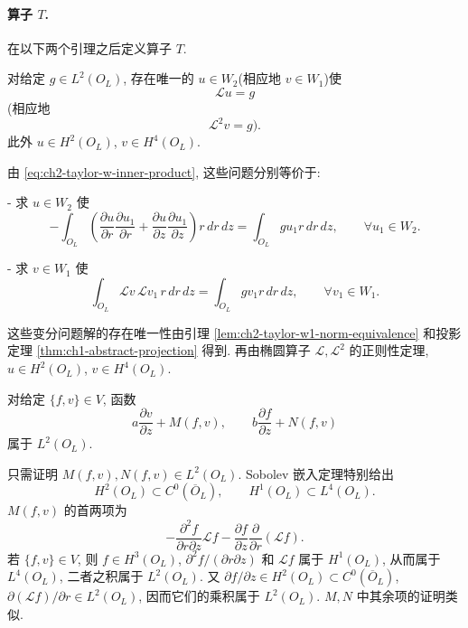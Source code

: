 \paragraph{算子 $T$.}
在以下两个引理之后定义算子 $T$.

\begin{Lemma}
\label{lem:ch2-taylor-elliptic-solvability}
对给定 $g\in L^2(O_L)$, 存在唯一的 $u\in W_2$(相应地 $v\in W_1$)使
\begin{equation}
\mathcal Lu=g
\label{eq:ch2-taylor-second-order-problem}
\end{equation}
(相应地
\begin{equation}
\mathcal L^2v=g).
\label{eq:ch2-taylor-fourth-order-problem}
\end{equation}
此外 $u\in H^2(O_L)$, $v\in H^4(O_L)$.
\end{Lemma}

\begin{Proof}
由 \eqref{eq:ch2-taylor-w-inner-product}, 这些问题分别等价于:

- 求 $u\in W_2$ 使
\[
-\int_{O_L}\left(
\frac{\partial u}{\partial r}\frac{\partial u_1}{\partial r}
+\frac{\partial u}{\partial z}\frac{\partial u_1}{\partial z}
\right)r\,dr\,dz
=\int_{O_L}gu_1r\,dr\,dz,
\qquad\forall u_1\in W_2.
\]

- 求 $v\in W_1$ 使
\[
\int_{O_L}\mathcal Lv\,\mathcal Lv_1\,r\,dr\,dz
=\int_{O_L}gv_1r\,dr\,dz,
\qquad\forall v_1\in W_1.
\]

\hypertarget{chapter-02-page-170}{}
这些变分问题解的存在唯一性由引理 \ref{lem:ch2-taylor-w1-norm-equivalence} 和投影定理 \ref{thm:ch1-abstract-projection} 得到. 再由椭圆算子 $\mathcal L,\mathcal L^2$ 的正则性定理, $u\in H^2(O_L)$, $v\in H^4(O_L)$.
\end{Proof}

\begin{Lemma}
\label{lem:ch2-taylor-nonlinear-l2}
对给定 $\{f,v\}\in V$, 函数
\[
a\frac{\partial v}{\partial z}+M(f,v),
\qquad
b\frac{\partial f}{\partial z}+N(f,v)
\]
属于 $L^2(O_L)$.
\end{Lemma}

\begin{Proof}
只需证明 $M(f,v),N(f,v)\in L^2(O_L)$. Sobolev 嵌入定理特别给出
\[
H^2(O_L)\subset C^0(\overline O_L),
\qquad
H^1(O_L)\subset L^4(O_L).
\]
$M(f,v)$ 的首两项为
\[
-\frac{\partial^2f}{\partial r\partial z}\mathcal Lf
-\frac{\partial f}{\partial z}\frac\partial{\partial r}(\mathcal Lf).
\]
若 $\{f,v\}\in V$, 则 $f\in H^3(O_L)$, $\partial^2f/(\partial r\partial z)$ 和 $\mathcal Lf$ 属于 $H^1(O_L)$, 从而属于 $L^4(O_L)$, 二者之积属于 $L^2(O_L)$. 又 $\partial f/\partial z\in H^2(O_L)\subset C^0(\overline O_L)$, $\partial(\mathcal Lf)/\partial r\in L^2(O_L)$, 因而它们的乘积属于 $L^2(O_L)$. $M,N$ 中其余项的证明类似.
\end{Proof}

